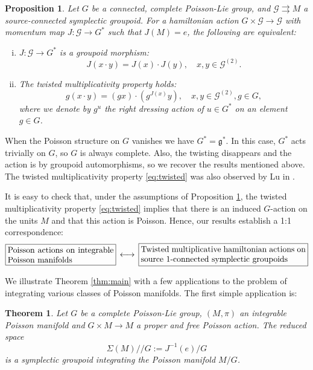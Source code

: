 \documentclass[a4paper,11pt]{amsart}
\newtheorem{thmz}{Theorem}
\newtheorem{propz}{Proposition}
\theoremstyle{definition}
\theoremstyle{remark}
\begin{document}
\begin{propz}
\label{prop:main:aux:intro} Let $G$ be a connected,
complete Poisson-Lie group, and ${\mathcal{G}}{\rightrightarrows} M$ a source-connected
symplectic groupoid. For a hamiltonian action $G\times{\mathcal{G}}\to {\mathcal{G}}$
with momentum map $J:{\mathcal{G}}\to G^*$ such that $J(M)={e}$, the
following are equivalent:
\begin{enumerate}[(i)]
\item $J:{\mathcal{G}}\to G^*$ is a groupoid morphism:
\[ J(x\cdot y)=J(x)\cdot J(y),\quad x,y\in{\mathcal{G}}^{(2)}.\]
\item The twisted multiplicativity property holds:
\begin{equation}
\label{eq:twisted}
g(x\cdot y)=(gx)\cdot (g^{J(x)}y),\quad x,y\in{\mathcal{G}}^{(2)}, g\in G,
\end{equation}
where we denote by $g^u$ the right dressing action of $u\in G^*$
on an element $g\in G$.
\end{enumerate}
\end{propz}

When the Poisson structure on $G$ vanishes we have $G^*={\mathfrak{g}}^*$. In this case, $G^*$ acts trivially on $G$, so
$G$ is always complete. Also, the twisting disappears and the action is by groupoid automorphisms, so we recover
the results mentioned above. The twisted multiplicativity property \eqref{eq:twisted} was also observed by Lu in
\cite{Lu2}.

It is easy to check that, under the assumptions of
Proposition \ref{prop:main:aux:intro}, the twisted multiplicativity
property \eqref{eq:twisted} implies that there is an induced $G$-action
on the units $M$ and that this action is Poisson. Hence,
our results establish a 1:1 correspondence:
\[
\framebox[4.7 cm]{\parbox{4.5 cm}{Poisson actions on integrable Poisson manifolds}}\, \longleftrightarrow \,
\framebox[7.2 cm]{\parbox{7 cm}{Twisted multiplicative hamiltonian actions on source 1-connected symplectic groupoids}}
\]

We illustrate Theorem \ref{thm:main} with a few applications to
the problem of integrating various classes of Poisson manifolds.
The first simple application is:

\begin{thmz}
\label{thm:Poisson:quotients}
Let $G$ be a complete Poisson-Lie group, $(M,\pi)$ an integrable Poisson manifold and $G\times M\to M$ a proper and free Poisson action.
The reduced space
\[\Sigma(M)//G:=J^{-1}(e)/G\]
is a symplectic groupoid integrating the Poisson manifold $M/G$.
\end{thmz}
\end{document}

